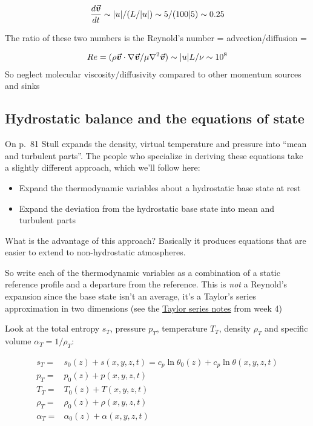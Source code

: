 \documentclass[12pt]{article}
\begin{document}
\begin{gather}
  \frac{ d \boldsymbol{\vec{v}}}{dt} \sim |u|/(L/|u|) \sim 5/(100|5) \sim 0.25
\end{gather}

The ratio of these two numbers is 
the Reynold's number = advection/diffusion =

\begin{gather}
Re=(\rho \boldsymbol{\vec{v}} \cdot \nabla \boldsymbol{\vec{v}} /\mu \nabla^2 \boldsymbol{\vec{v}}) \sim  |u| L/\nu \sim 10^{8}
\end{gather}
So neglect molecular viscosity/diffusivity compared to other momentum sources
and sinks

\subsection{Hydrostatic balance and the equations of state}
\label{sec:energy}

On p.~81 Stull expands the density, virtual temperature and pressure into
``mean and turbulent parts''.  The people who specialize in deriving
these equations take a slightly different approach, which we'll follow
here:

\begin{itemize}
\item Expand the thermodynamic variables about a hydrostatic base state at rest
\item Expand the deviation from the hydrostatic base state into mean and turbulent parts
\end{itemize}
What is the advantage of this approach?  Basically it produces equations that are
easier to extend to non-hydrostatic atmospheres.

So write each of the thermodynamic variables as a combination of a static reference profile
and a departure from the reference.  This is \textit{not} a Reynold's expansion since
the base state isn't an average, it's  a Taylor's series approximation in
two dimensions (see the 
\href{https://www.dropbox.com/scl/fi/zwjwuzed05cvya6xydj9e/taylor_series.pdf?rlkey=jt7zu8gedkwxaosty87e7h0o8&dl=0}{Taylor series notes}  from week 4)


Look at
the total entropy $s_T$, pressure $p_T$, temperature $T_T$, density $\rho_T$ and specific
volume $\alpha_T = 1/\rho_T$:

\begin{subequations}
\begin{align}
  s_T =& s_0(z) + s(x,y,z,t) = c_p \ln \theta_0 (z) + c_p \ln \theta (x,y,z,t)\\ 
  p_T =& p_0(z) + p(x,y,z,t) \\
  T_T =& T_0(z) + T(x,y,z,t) \\
  \rho_T =& \rho_0(z) + \rho(x,y,z,t) \\
  \alpha_T =& \alpha_0(z) + \alpha(x,y,z,t)
\end{align}
\end{subequations}
\end{document}

